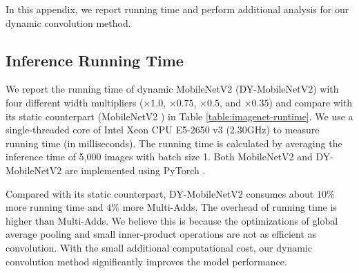 \documentclass[10pt,twocolumn,letterpaper]{article}
\begin{document}
In this appendix, we report running time and perform additional analysis for our dynamic convolution method.

\subsection{Inference Running Time}
We report the running time of dynamic MobileNetV2 (DY-MobileNetV2) with four different width multipliers ($\times1.0$, $\times0.75$, $\times0.5$, and $\times0.35$) and compare with its static counterpart (MobileNetV2 \cite{sandler2018mobilenetv2}) in Table \ref{table:imagenet-runtime}. We use a single-threaded core of Intel Xeon CPU E5-2650 v3 (2.30GHz) to measure running time (in milliseconds). The running time is calculated by averaging the inference time of 5,000 images with batch size 1. Both MobileNetV2 and DY-MobileNetV2 are implemented using PyTorch \cite{paszke2017automatic}.

Compared with its static counterpart, DY-MobileNetV2 consumes about $10\%$ more running time and $4\%$ more Multi-Adds. The overhead of running time is higher than Multi-Adds. We believe this is because the optimizations of global average pooling and small inner-product operations are not as efficient as convolution. With the small additional computational cost, our dynamic convolution method significantly improves the model performance.
\end{document}
